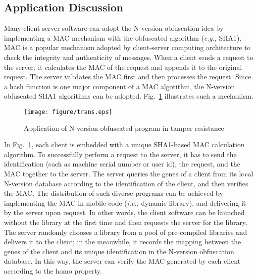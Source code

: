 \documentclass[10pt, conference]{IEEEtran}
\begin{document}
\subsection{Application Discussion} \label{section:application}

Many client-server software can adopt the N-version obfuscation idea by implementing a MAC mechanism with the obfuscated algorithm (\textit{e.g.,} SHA1).  MAC is a popular mechanism adopted by client-server computing architecture to check the integrity and authenticity of messages.  When a client sends a request to the server, it calculates the MAC of the request and appends it to the original request.  The server validates the MAC first and then processes the request.  Since a hash function is one major component of a MAC algorithm, the N-version obfuscated SHA1 algorithms can be adopted.  Fig.~\ref{fig:application} illustrates such a mechanism.  

\begin{figure}[t]
\centering
\texttt{[image: figure/trans.eps]}
\caption{Application of N-version obfuscated program in tamper resistance}
\label{fig:application}
\end{figure}

In Fig.~\ref{fig:application}, each client is embedded with a unique SHA1-based MAC calculation algorithm.  To successfully perform a request to the server, it has to send the identification (such as machine serial number or user id), the request, and the MAC together to the server.  The server queries the genes of a client from its local N-version database according to the identification of the client, and then verifies the MAC.  The distribution of such diverse programs can be achieved by implementing the MAC in mobile code (\textit{i.e.,} dynamic library), and delivering it by the server upon request.  In other words, the client software can be launched without the library at the first time and then requests the server for the library.  The server randomly chooses a library from a pool of pre-compiled libraries and delivers it to the client; in the meanwhile, it records the mapping between the genes of the client and its unique identification in the N-version obfuscation database.  In this way, the server can verify the MAC generated by each client according to the homo property.
\end{document}
